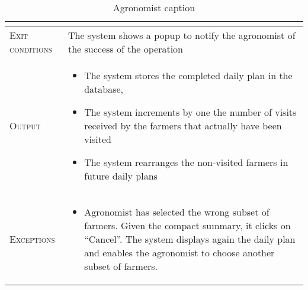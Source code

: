 \begin{table}[H]
\begin{tabular}[c]{|l|p{}|}
\begin{itemize}
                                        \end{itemize}\\
        \hline %
        \textsc{Exit conditions}    &  The system shows a popup to notify the agronomist of the success of the operation
        \\
    	\hline %
    	\textsc{Output}             &  \begin{itemize}
    	    \item The system stores the completed daily plan in the database, 
            \item The system increments by one the number of visits received by the farmers that actually have been visited
            \item The system rearranges the non-visited farmers in future daily plans

    	\end{itemize}\\
    	\hline %
    	\textsc{Exceptions}         &  \begin{itemize}
    	    \item Agronomist has selected the wrong subset of farmers. Given the compact summary, it clicks on “Cancel”. The system displays again the daily plan and enables the agronomist to choose another subset of farmers.
    	\end{itemize}\\
    	
    	\hline %
        
    \end{tabular}
    \caption{\label{tab:confirm_deviations_section}Agronomist caption }
\end{table}